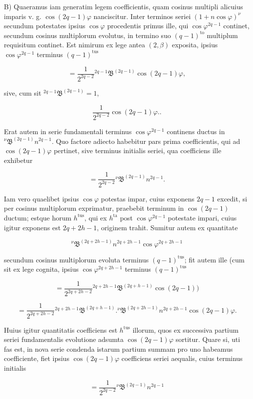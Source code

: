 \par\noindent{}%
\hspace*{\parindent}B) Quaeramus iam generatim legem coefficientis, quam cosinus multipli alicuius imparis v. g. $\cos(2q-1)\varphi$ nanciscitur. Inter terminos seriei $(1+n\cos\varphi)^{\nu}$ secundum potestates ipsius $\cos\varphi$ procedentis primus ille, qui $\cos\varphi^{2q-1}$ continet, secundum cosinus multiplorum evolutus, in termino suo $(q-1)^{\text{to}}$ multiplum requisitum continet. Est nimirum ex lege antea $(2,\beta)$ exposita, ipsius $\cos\varphi^{2q-1}$ terminus $(q-1)^{\text{tus}}$

\[
= \frac{1}{2^{2q-2}} {}^{2q-1}\mathfrak{B}^{(2q-1)} \cos(2q-1)\varphi,
\]

\noindent sive, cum sit ${}^{2q-1}\mathfrak{B}^{(2q-1)} = 1$,

\[
\frac{1}{2^{2q-2}} \cos(2q-1)\varphi..
\]

\noindent Erat autem in serie fundamentali terminus $\cos\varphi^{2q-1}$ continens ductus in ${}^{\nu}\mathfrak{B}^{(2q-1)} n^{2q-1}$. Quo factore adiecto habebitur pars prima coefficientis, qui ad $\cos(2q-1)\varphi$ pertinet, sive terminus initialis seriei, qua coefficiens ille exhibetur

\[
= \frac{1}{2^{2q-2}} {}^{\nu}\mathfrak{B}^{(2q-1)} n^{2q-1}.
\]

\noindent Iam vero quaelibet ipsius $\cos\varphi$ potestas impar, cuius exponens $2q-1$ excedit, si per cosinus multiplorum exprimatur, praebebit terminum in $\cos(2q-1)$ ductum; estque horum $h^{\text{tus}}$, qui ex $h^{\text{ta}}$ post $\cos\varphi^{2q-1}$ potestate impari, cuius igitur exponens est $2q+2h-1$, originem trahit. Sumitur autem ex quantitate

\[
{}^{\nu}\mathfrak{B}^{(2q+2h-1)} n^{2q+2h-1} \cos\varphi^{2q+2h-1}
\]

\noindent secundum cosinus multiplorum evoluta terminus $(q-1)^{\text{tus}}$; fit autem ille (cum sit ex lege cognita, ipsius $\cos\varphi^{2q+2h-1}$ terminus $(q-1)^{\text{tus}}$

\[
= \frac{1}{2^{2q+2h-2}} {}^{2q+2h-1}\mathfrak{B}^{(2q+h-1)} \cos(2q-1)) 
\]

\[
= \frac{1}{2^{2q+2h-2}} {}^{2q+2h-1}\mathfrak{B}^{(2q+h-1)}  .  {}^{\nu}\mathfrak{B}^{(2q+2h-1)} n^{2q+2h-1} \cos(2q-1)\varphi.
\]

\noindent Huius igitur quantitatis coefficiens est $h^{\text{tus}}$ illorum, quos ex successiva partium seriei fundamentalis evolutione adsumta $\cos(2q-1)\varphi$ sortitur. Quare si, uti fas est, in nova serie condenda istarum partium summam pro uno habeamus coefficiente, fiet ipsius $\cos(2q-1)\varphi$ coefficiens seriei aequalis, cuius terminus initialis

\[
= \frac{1}{2^{2q-2}} {}^{\nu}\mathfrak{B}^{(2q-1)} n^{2q-1}
\]
